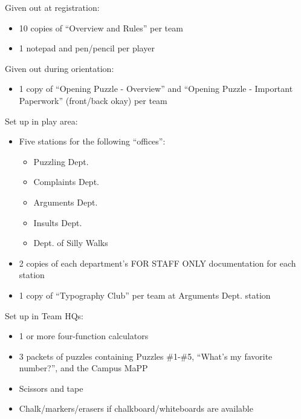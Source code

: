 
\begin{printList}


\noindent
Given out at registration:

\begin{itemize}
  \item
  10 copies of ``Overview and Rules'' per team
  \item
  1 notepad and pen/pencil per player
\end{itemize}

\noindent
Given out during orientation:

\begin{itemize}
  \item
  1 copy of ``Opening Puzzle - Overview'' and
  ``Opening Puzzle - Important Paperwork'' (front/back okay) per team
\end{itemize}


\noindent
Set up in play area:

\begin{itemize}
  \item
  Five stations for the following ``offices'':
    \begin{itemize}
      \item Puzzling Dept.
      \item Complaints Dept.
      \item Arguments Dept.
      \item Insults Dept.
      \item Dept. of Silly Walks
    \end{itemize}
  \item
  2 copies of each department's FOR STAFF ONLY documentation for each
  station
  \item
  1 copy of ``Typography Club'' per team at Arguments Dept. station
\end{itemize}
\newpage
{}

\noindent
Set up in Team HQs:

\begin{itemize}
  \item
  1 or more four-function calculators
  \item
  3 packets of puzzles containing Puzzles \#1-\#5,
  ``What's my favorite number?'', and the Campus MaPP
  \item
  Scissors and tape
  \item
  Chalk/markers/erasers if chalkboard/whiteboards are available
\end{itemize}


\end{printList}
